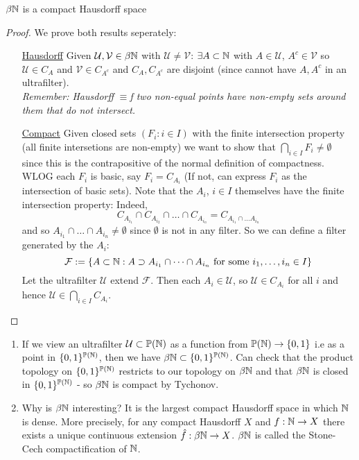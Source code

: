 \documentclass[a4paper]{article}
\renewcommand{\F}{\mathcal{F}}
\renewcommand{\U}{\mathcal{U}}
\renewcommand{\V}{\mathcal{V}}
\begin{document}
  \begin{thm}
    $\beta\mathbb{N}$ is a compact Hausdorff space
  \end{thm}
  \begin{proof}
    We prove both results seperately:
    \begin{itemize}
    \item[\underline{Hausdorff}] Given $\U, \V \in \beta\N$ with $\U \neq \V$:
      $\exists A \subset \mathbb{N}$ with $A \in \U$, $A^c \in \V$ so $\U \in C_A$ and
      $\V \in C_{A^c}$ and $C_A, C_{A^c}$ are disjoint (since cannot have $A,
      A^c$ in an ultrafilter).\\
      \textit{Remember: Hausdorff }$\equiv$\textit{f two non-equal points have non-empty sets around them that do not intersect.}
    \item[\underline{Compact}] Given closed sets $\left(F_i : i \in I \right)$ with the
      finite intersection property (all finite intersetions are non-empty)
      we want to show that $\bigcap_{i \in I} F_i \neq \emptyset$ since
      this is the contrapositive of the normal definition of compactness.\\
      WLOG each $F_i$ is basic, say $F_i = C_{A_i}$ (If not, can express
      $F_i$ as the intersection of basic sets). Note that the $A_i$, $i \in I$
      themselves have the finite intersection property: Indeed,
      \[C_{A_{i_1}} \cap C_{A_{i_2}} \cap \dots \cap C_{A_{i_n}} =
        C_{A_{i_1} \cap \dots A_{i_n}}\]
      and so $A_{i_1} \cap \dots \cap A_{i_n} \neq \emptyset$ since
      $\emptyset$ is not in any filter. So we can
      define a filter generated by the $A_i$:
      \[\F := \{A \subset \N : A \supset A_{i_1} \cap \dots \cap A_{i_n}
        \text{ for some } i_1, \dots, i_n \in I\}\]
      Let the ultrafilter $\U$ extend $\F$. Then each $A_i \in \U$, so $\U
      \in C_{A_i}$ for all $i$ and hence $\U \in \bigcap_{i \in I} C_{A_i}$.
    \end{itemize}
  \end{proof}
  \begin{remarks}
    \begin{enumerate}
    \item If we view an ultrafilter $\U \subset \P(\N)$ as a function from
      $\mathbb{P}(\mathbb{N}) \to \{0,1\}$ i.e as a point in $\{0,1\}^{\mathbb{P}(\mathbb{N})}$, then we
      have $\beta\mathbb{N} \subset \{0,1\}^{\mathbb{P}(\mathbb{N})}$. Can check that the product
      topology on $\{0,1\}^{\mathbb{P}(\mathbb{N})}$ restricts to our topology on $\beta\mathbb{N}$
      and that $\beta\mathbb{N}$ is closed in $\{0,1\}^{\mathbb{P}(\mathbb{N})}$ - so $\beta\mathbb{N}$ is
      compact by Tychonov.
    \item Why is $\beta\mathbb{N}$ interesting? It is the largest compact
      Hausdorff space in which $\mathbb{N}$ is dense. More precisely, for any
      compact Hausdorff $X$ and $f: \mathbb{N} \to X$ there exists a unique
      continuous extension $\hat{f}: \beta\mathbb{N} \to X$. $\beta\mathbb{N}$ is called
      the Stone-Cech compactification of $\mathbb{N}$.
    \end{enumerate}
  \end{remarks}
\end{document}
